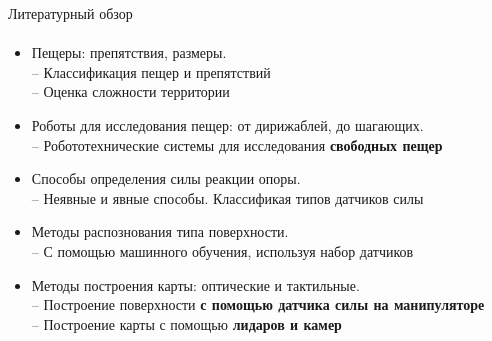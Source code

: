 \documentclass[aspectratio=169,xcolor=table]{beamer}
\begin{document}
\begin{frame}[t]{Литературный обзор}
    \framesubtitle{}
    \vspace{-0.65cm}
    \begin{itemize}
        \item Пещеры: препятствия, размеры. \\ \alert{-- Классификация пещер и препятствий \\ -- Оценка сложности территории}
        \item Роботы для исследования пещер: от дирижаблей, до шагающих. \\ \alert{-- Робототехнические системы для исследования \textbf{свободных пещер}}
        \item Способы определения силы реакции опоры. \\ \alert{-- Неявные и явные способы. Классификая типов датчиков силы}
        \item Методы распознования типа поверхности. \\ \alert{-- С помощью машинного обучения, используя набор датчиков}
        \item Методы построения карты: оптические и тактильные. \\ \alert{-- Построение поверхности \textbf{с помощью датчика силы на манипуляторе} \\ -- Построение карты с помощью \textbf{лидаров и камер}}
    \end{itemize}

\end{frame}
\end{document}
